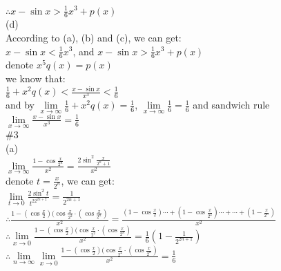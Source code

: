 \documentclass{article}
\begin{document}
$\therefore$\qquad $x-\sin x>\frac{1}{6}x^3+p(x)$\\

(d)\\

According to (a), (b) and (c), we can get:\\

$\displaystyle x-\sin x<\frac{1}{6}x^3$, and $\displaystyle x-\sin x>\frac{1}{6}x^3+p(x)$\\

denote $x^5q(x)=p(x)$\\

we know that:\\

$\displaystyle\frac{1}{6}+x^2q(x)<\frac{x-\sin x}{x^3}<\frac{1}{6}$\\

and by $\lim \limits_{x \to \infty}\displaystyle\frac{1}{6}+x^2q(x)=\frac{1}{6}$, $\lim \limits_{x \to \infty}\displaystyle\frac{1}{6}=\frac{1}{6}$ and sandwich rule\\

$\lim \limits_{x \to \infty}\displaystyle\frac{x-\sin x}{x^3}=\frac{1}{6}$\\

\textcolor[rgb]{0.00,0.00,0.50}{\#3}\\

(a)\\

$\displaystyle\lim \limits_{x \to \infty}\frac{1-\cos\frac{x}{2^n}}{x^2}=\frac{2\sin^2\frac{x}{2^n+1}}{x^2}$\\

denote $\displaystyle t=\frac{x}{2^n}$, we can get:\\

$\lim \limits_{t \to 0}\frac{2\sin^2t}{t^22^{2n+2}}=\frac{1}{2^{2n+1}}$\\

$\therefore$\qquad$\displaystyle\frac{1-(\cos\frac{x}{2})(\cos\frac{x}{2^2}\cdot(\cos\frac{x}{2^n})}{x^2}=\frac{(1-\cos\frac{x}{2})\cdots+(1-\cos\frac{x}{2^2})\cdots+\cdots+(1-\frac{x}{2^n})}{x^2}$\\

$\therefore$\qquad$\lim \limits_{x \to 0}\displaystyle\frac{1-(\cos\frac{x}{2})(\cos\frac{x}{2^2}\cdot(\cos\frac{x}{2^n})}{x^2}=\frac{1}{6}\left(1-\frac{1}{2^{2n+1}}\right)$\\

$\therefore$\qquad$\lim \limits_{n \to \infty}\lim \limits_{x \to 0}\displaystyle\frac{1-(\cos\frac{x}{2})(\cos\frac{x}{2^2}\cdot(\cos\frac{x}{2^n})}{x^2}=\frac{1}{6}$\\
\end{document}
